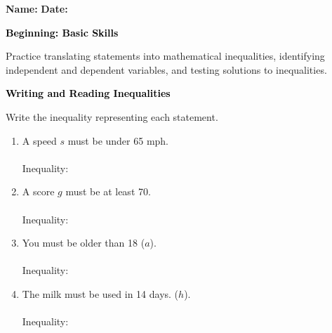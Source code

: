 \documentclass[12pt, letterpaper, fleqn]{article}
\newcommand{\blanklong}{\underline{\hspace{6.5cm}}}
\begin{document}
\textbf{Name:} \underline{\hspace{5cm}}
\hfill
\textbf{Date:} \underline{\hspace{3cm}}\\

\begin{tcolorbox}[colback=black!10]
    \large\textcolor{black}{\textbf{Beginning: Basic Skills}}
\end{tcolorbox}

\vspace{3mm}
\noindent
Practice translating statements into mathematical inequalities, identifying independent and dependent variables, and testing solutions to inequalities.

\vspace{4mm}

\begin{tcolorbox}[colback=black!10]
\large\textcolor{black}{\textbf{Writing and Reading Inequalities}}
\end{tcolorbox}

\noindent
Write the inequality representing each statement.

\vspace{3mm}

\begin{enumerate}[itemsep=1.5cm, leftmargin=0.6cm]

\item A speed $s$ must be under 65 mph. \\ \\
Inequality: \blanklong

\vspace{0.5cm}

\item A score $g$ must be at least 70. \\ \\
Inequality: \blanklong

\vspace{0.5cm}

\item You must be older than 18 ($a$). \\ \\
Inequality: \blanklong

\vspace{0.5cm}

\item The milk must be used in 14 days. ($h$). \\ \\
Inequality: \blanklong

\vspace{0.5cm}

\end{enumerate}
\end{document}
